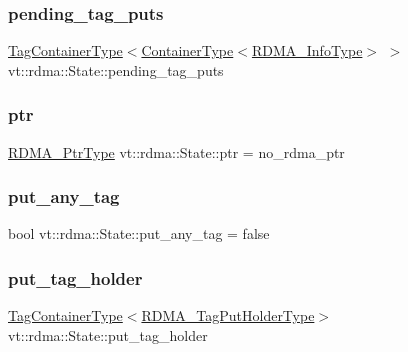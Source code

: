 \subsubsection{\texorpdfstring{pending\+\_\+tag\+\_\+puts}{pending\_tag\_puts}}
{\footnotesize\ttfamily \hyperlink{structvt_1_1rdma_1_1_state_ad84b403803cc575ef54d0d0ac74017e9}{Tag\+Container\+Type}$<$\hyperlink{structvt_1_1rdma_1_1_state_a7506401f1846be85f14e73e75b773a5d}{Container\+Type}$<$\hyperlink{structvt_1_1rdma_1_1_state_a6a78216795efe7fb6966c33b1a21d7cf}{R\+D\+M\+A\+\_\+\+Info\+Type}$>$ $>$ vt\+::rdma\+::\+State\+::pending\+\_\+tag\+\_\+puts\hspace{0.3cm}{\ttfamily [private]}}

\mbox{\label{structvt_1_1rdma_1_1_state_a60bb2c1f277de56d89e741f87e944c93}} 
\subsubsection{\texorpdfstring{ptr}{ptr}}
{\footnotesize\ttfamily \hyperlink{namespacevt_a9e2c953286c7616f7c218e9951790776}{R\+D\+M\+A\+\_\+\+Ptr\+Type} vt\+::rdma\+::\+State\+::ptr = no\+\_\+rdma\+\_\+ptr}

\mbox{\label{structvt_1_1rdma_1_1_state_a934ef23284043246b24c3f746919bc79}} 
\subsubsection{\texorpdfstring{put\+\_\+any\+\_\+tag}{put\_any\_tag}}
{\footnotesize\ttfamily bool vt\+::rdma\+::\+State\+::put\+\_\+any\+\_\+tag = false\hspace{0.3cm}{\ttfamily [private]}}

\mbox{\label{structvt_1_1rdma_1_1_state_aed4540b539aa2d8e86f83f235c0722ad}} 
\subsubsection{\texorpdfstring{put\+\_\+tag\+\_\+holder}{put\_tag\_holder}}
{\footnotesize\ttfamily \hyperlink{structvt_1_1rdma_1_1_state_ad84b403803cc575ef54d0d0ac74017e9}{Tag\+Container\+Type}$<$\hyperlink{structvt_1_1rdma_1_1_state_a8a25176f05bb2570889d6b41089ac1ca}{R\+D\+M\+A\+\_\+\+Tag\+Put\+Holder\+Type}$>$ vt\+::rdma\+::\+State\+::put\+\_\+tag\+\_\+holder\hspace{0.3cm}{\ttfamily [private]}}

